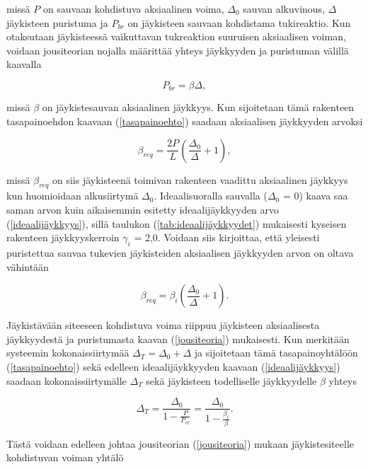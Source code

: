 \documentclass[12pt]{article}
\newenvironment{content}{\pagenumbering{arabic}}{}
\begin{document}
\begin{content}
missä $P$ on sauvaan kohdistuva aksiaalinen voima, $\Delta_0$ sauvan alkuvinous, $\Delta$ jäykisteen puristuma ja $P_{br}$ on jäykisteen sauvaan kohdistama tukireaktio. Kun otaksutaan jäykisteessä vaikuttavan tukreaktion suuruisen aksiaalisen voiman, voidaan jousiteorian nojalla määrittää yhteys jäykkyyden ja puristuman välillä kaavalla

\begin{equation}
\label{jousiteoria}
P_{br} = \beta \Delta,
\end{equation}

missä $\beta$ on jäykistesauvan aksiaalinen jäykkyys. Kun sijoitetaan tämä rakenteen tasapainoehdon kaavaan (\ref{tasapainoehto}) saadaan aksiaalisen jäykkyyden arvoksi

\begin{equation}
\label{breq}
\beta_{req} = \frac{2 P}{L} (\frac{\Delta_0}{\Delta} + 1),
\end{equation}

missä $\beta_{req}$ on siis jäykisteenä toimivan rakenteen vaadittu aksiaalinen jäykkyys kun huomioidaan alkusiirtymä $\Delta_0$. Ideaalisuoralla sauvalla ($\Delta_0$ = 0) kaava saa saman arvon kuin aikaisemmin esitetty ideaalijäykkyyden arvo (\ref{ideaalijäykkyys}), sillä taulukon (\ref{tab:ideaalijäykkyydet}) mukaisesti kyseisen rakenteen jäykkyyskerroin $\gamma_i$ = 2,0. Voidaan siis kirjoittaa, että yleisesti puristettua sauvaa tukevien jäykisteiden aksiaalisen jäykkyyden arvon on oltava vähintään

\begin{equation}
\label{breq_2}
\beta_{req} = \beta_i (\frac{\Delta_0}{\Delta} + 1).
\end{equation}

Jäykistävään siteeseen kohdistuva voima riippuu jäykisteen aksiaalisesta jäykkyydestä ja puristumasta kaavan (\ref{jousiteoria}) mukaisesti. Kun merkitään systeemin kokonaissiirtymää $\Delta_T = \Delta_0 + \Delta$ ja sijoitetaan tämä tasapainoyhtälöön (\ref{tasapainoehto}) sekä edelleen ideaalijäykkyyden kaavaan (\ref{ideaalijäykkyys}) saadaan kokonaissiirtymälle $\Delta_T$ sekä jäykisteen todelliselle jäykkyydelle $\beta$ yhteys

\begin{equation}
\label{delta_tot}
\Delta_T = \frac{\Delta_0}{1-\frac{P}{P_{cr}}} = \frac{\Delta_0}{1-\frac{\beta_i}{\beta}}.
\end{equation}

Tästä voidaan edelleen johtaa jousiteorian (\ref{jousiteoria}) mukaan jäykistesiteelle kohdistuvan voiman yhtälö


\end{content}
\end{document}
